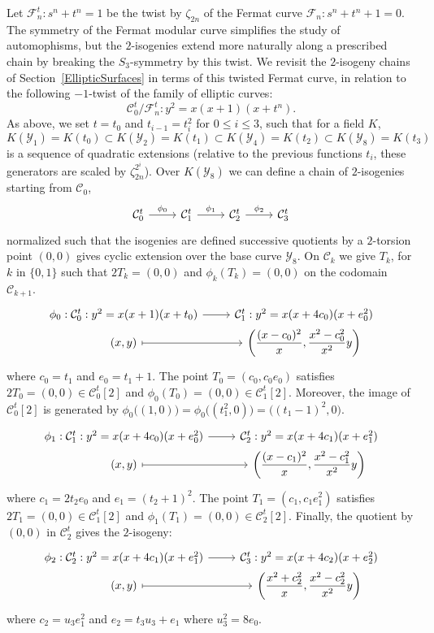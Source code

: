 \documentclass{amsart}
\newcommand{\cC}{\mathcal{C}}
\newcommand{\cF}{\mathcal{F}}
\newcommand{\cY}{\mathcal{Y}}
\newcommand{\dsp}{\displaystyle}
\begin{document}
Let $\cF_n^t: s^n + t^n = 1$ be the twist by $\zeta_{2n}$ of the Fermat curve
$\cF_n: s^n + t^n + 1 = 0$.  The symmetry of the Fermat modular curve simplifies
the study of automophisms, but the $2$-isogenies extend more naturally along
a prescribed chain by breaking the $S_3$-symmetry by this twist.
We revisit the $2$-isogeny chains of Section~\ref{EllipticSurfaces} in terms
of this twisted Fermat curve, in relation to the following $-1$-twist of the
family of elliptic curves:
$$
\cC_0^t/\cF_n^t: y^2 = x(x + 1)(x + t^n).
$$
As above, we set $t = t_0$ and $t_{i-1} = t_{i}^2$ for $0 \le i \le 3$, such
that for a field $K$,
$$
K(\cY_1) = K(t_0) \subset K(\cY_2) = K(t_1) \subset K(\cY_4) = K(t_2) \subset K(\cY_{8}) = K(t_3)
$$
is a sequence of quadratic extensions (relative to the previous functions
$t_i$, these generators are scaled by $\zeta_{2n}^{2^i}$).
Over $K(\cY_8)$ we can define a chain of $2$-isogenies starting from $\cC_0$,
$$
\begin{tikzcd}
  \cC_0^t \arrow[r,"\phi_0"] & \cC_1^t \arrow[r,"\phi_1"] & \cC_2^t \arrow[r,"\phi_2"] & \cC_3^t
\end{tikzcd}
$$
normalized such that the isogenies are defined successive quotients by a $2$-torsion
point $(0,0)$ gives cyclic extension over the base curve $\cY_8$.
On $\cC_k$ we give $T_k$, for $k$ in $\{0,1\}$ such that $2T_k = (0,0)$ and $\phi_k(T_k) = (0,0)$
on the codomain $\cC_{k+1}$.
$$
\begin{tikzcd}[row sep=0mm]
  \phi_0: \cC_0^t: y^2 = x(x + 1)(x + t_0) \arrow[r] & \cC_1^t: y^2 = x(x + 4c_0)(x + e_0^2)\\
  (x,y) \arrow[r,mapsto] & \dsp\left(\frac{(x-c_0)^2}{x}, \frac{x^2-c_0^2}{x^2}y\right)
\end{tikzcd}
$$
where $c_0 = t_1$ and $e_0 = t_1+1$. 
The point $T_0 = (c_0,c_0 e_0)$ satisfies $2T_0 = (0,0) \in \cC_0^t[2]$ and $\phi_0(T_0) = (0,0) \in \cC_1^t[2]$.
Moreover, the image of $\cC_0^t[2]$ is generated by
$
\phi_0\big((1,0)\big) = \phi_0\big((t_1^2,0)\big) = \big((t_1-1)^2,0\big).
$
$$
\begin{tikzcd}[row sep=0mm]
  \phi_1: \cC_1^t: y^2 = x(x + 4c_0)(x + e_0^2) \arrow[r] & \cC_2^t: y^2 = x(x + 4c_1)(x + e_1^2)\\
  (x,y) \arrow[r,mapsto] & \dsp\left(\frac{(x-c_1)^2}{x}, \frac{x^2-c_1^2}{x^2}y\right)
\end{tikzcd}
$$
where $c_1 = 2t_2e_0$ and $e_1 = (t_2+1)^2$. The point $T_1 = (c_1, c_1e_1^2)$ satisfies $2T_1 = (0,0) \in \cC_1^t[2]$
and $\phi_1(T_1) = (0,0) \in \cC_2^t[2]$.
Finally, the quotient by $(0,0)$ in $\cC_2^t$ gives the $2$-isogeny:
$$
\begin{tikzcd}[row sep=0mm]
  \phi_2: \cC_2^t: y^2 = x(x + 4c_1)(x + e_1^2) \arrow[r] & \cC_3^t: y^2 = x(x + 4c_2)(x + e_2^2)
  \\
  (x,y) \arrow[r,mapsto] & \dsp\left(\frac{x^2+c_2^2}{x}, \frac{x^2-c_2^2}{x^2}y\right)
\end{tikzcd}
$$
where $c_2 = u_3e_1^2$ and $e_2 = t_3 u_3 + e_1$ where $u_3^2 = 8e_0$.
\end{document}
